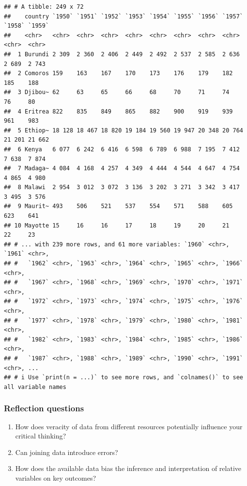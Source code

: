 \documentclass[
]{book}
\providecommand{\tightlist}{%
  \setlength{\itemsep}{0pt}\setlength{\parskip}{0pt}}
\begin{document}
\begin{verbatim}
## # A tibble: 249 x 72
##    country `1950` `1951` `1952` `1953` `1954` `1955` `1956` `1957` `1958` `1959`
##    <chr>   <chr>  <chr>  <chr>  <chr>  <chr>  <chr>  <chr>  <chr>  <chr>  <chr> 
##  1 Burundi 2 309  2 360  2 406  2 449  2 492  2 537  2 585  2 636  2 689  2 743 
##  2 Comoros 159    163    167    170    173    176    179    182    185    188   
##  3 Djibou~ 62     63     65     66     68     70     71     74     76     80    
##  4 Eritrea 822    835    849    865    882    900    919    939    961    983   
##  5 Ethiop~ 18 128 18 467 18 820 19 184 19 560 19 947 20 348 20 764 21 201 21 662
##  6 Kenya   6 077  6 242  6 416  6 598  6 789  6 988  7 195  7 412  7 638  7 874 
##  7 Madaga~ 4 084  4 168  4 257  4 349  4 444  4 544  4 647  4 754  4 865  4 980 
##  8 Malawi  2 954  3 012  3 072  3 136  3 202  3 271  3 342  3 417  3 495  3 576 
##  9 Maurit~ 493    506    521    537    554    571    588    605    623    641   
## 10 Mayotte 15     16     16     17     18     19     20     21     22     23    
## # ... with 239 more rows, and 61 more variables: `1960` <chr>, `1961` <chr>,
## #   `1962` <chr>, `1963` <chr>, `1964` <chr>, `1965` <chr>, `1966` <chr>,
## #   `1967` <chr>, `1968` <chr>, `1969` <chr>, `1970` <chr>, `1971` <chr>,
## #   `1972` <chr>, `1973` <chr>, `1974` <chr>, `1975` <chr>, `1976` <chr>,
## #   `1977` <chr>, `1978` <chr>, `1979` <chr>, `1980` <chr>, `1981` <chr>,
## #   `1982` <chr>, `1983` <chr>, `1984` <chr>, `1985` <chr>, `1986` <chr>,
## #   `1987` <chr>, `1988` <chr>, `1989` <chr>, `1990` <chr>, `1991` <chr>, ...
## # i Use `print(n = ...)` to see more rows, and `colnames()` to see all variable names
\end{verbatim}

\hypertarget{reflection-questions-4}{%
\subsubsection*{Reflection questions}\label{reflection-questions-4}}

\begin{enumerate}
\def\labelenumi{\arabic{enumi}.}
\tightlist
\item
  How does veracity of data from different resources potentially influence your critical thinking?\\
\item
  Can joining data introduce errors?
\item
  How does the available data bias the inference and interpretation of relative variables on key outcomes?
\end{enumerate}
\end{document}

